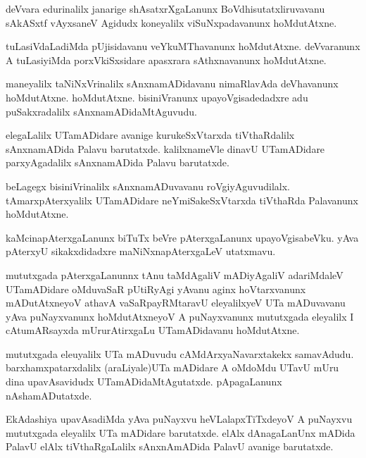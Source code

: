 \documentclass{article}
\begin{document}
\begin{mn}%
deVvara edurinalilx janarige shAsatxrXgaLanunx BoVdhisutatxliruvavanu sAkASxtf vAyxsaneV Agidudx 
koneyalilx viSuNxpadavanunx hoMdutAtxne.
\end{mn}

\begin{mn}%
tuLasiVdaLadiMda pUjisidavanu veYkuMThavanunx hoMdutAtxne. deVvaranunx A tuLasiyiMda porxVkiSxsidare 
apasxrara sAthxnavanunx hoMdutAtxne.
\end{mn}

\begin{mn}%
maneyalilx taNiNxVrinalilx sAnxnamADidavanu nimaRlavAda deVhavanunx hoMdutAtxne. hoMdutAtxne. 
bisiniVranunx upayoVgisadedadxre adu puSakxradalilx sAnxnamADidaMtAguvudu.
\end{mn}

\begin{mn}%
elegaLalilx UTamADidare avanige kurukeSxVtarxda tiVthaRdalilx sAnxnamADida Palavu barutatxde. 
kalilxnameVle dinavU UTamADidare parxyAgadalilx sAnxnamADida Palavu barutatxde.
\end{mn}

\begin{mn}%
beLagegx bisiniVrinalilx sAnxnamADuvavanu roVgiyAguvudilalx. tAmarxpAterxyalilx UTamADidare 
neYmiSakeSxVtarxda tiVthaRda Palavanunx hoMdutAtxne.
\end{mn}

\begin{mn}%
kaMcinapAterxgaLanunx biTuTx beVre pAterxgaLanunx upayoVgisabeVku. yAva pAterxyU sikakxdidadxre 
maNiNxnapAterxgaLeV utatxmavu.
\end{mn}

\begin{mn}%
mututxgada pAterxgaLanunnx tAnu taMdAgaliV mADiyAgaliV adariMdaleV UTamADidare oMduvaSaR pUtiRyAgi 
yAvanu aginx hoVtarxvanunx mADutAtxneyoV athavA vaSaRpayRMtaravU eleyalilxyeV UTa mADuvavanu yAva 
puNayxvanunx hoMdutAtxneyoV A puNayxvanunx mututxgada eleyalilx I cAtumARsayxda mUrurAtirxgaLu 
UTamADidavanu hoMdutAtxne.
\end{mn}

\begin{mn}%
mututxgada eleuyalilx UTa mADuvudu cAMdArxyaNavarxtakekx samavAdudu. barxhamxpatarxdalilx 
(araLiyale)UTa mADidare A oMdoMdu UTavU mUru dina upavAsavidudx UTamADidaMtAgutatxde. pApagaLanunx 
nAshamADutatxde.
\end{mn}

\begin{mn}%
EkAdashiya upavAsadiMda yAva puNayxvu heVLalapxTiTxdeyoV A puNayxvu mututxgada eleyalilx UTa 
mADidare barutatxde. elAlx dAnagaLanUnx mADida PalavU elAlx tiVthaRgaLalilx sAnxnAmADida PalavU 
avanige barutatxde.
\end{mn}
\end{document}
